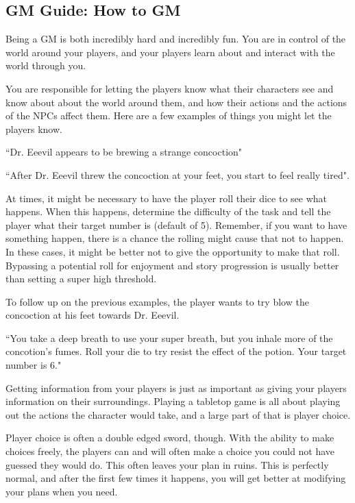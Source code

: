 \begin{flushleft}

\chapter{GM Guide: How to GM} \label{gmguide}

Being a GM is both incredibly hard and incredibly fun. You are in control of
the world around your players, and your players learn about and interact with
the world through you.

You are responsible for letting the players know what their characters see and
know about about the world around them, and how their actions and the actions
of the NPCs affect them. Here are a few examples of things you might let the
players know.

``Dr. Eeevil appears to be brewing a strange concoction"

``After Dr. Eeevil threw the concoction at your feet, you start to feel really
tired".

At times, it might be necessary to have the player roll their dice to see what
happens. When this happens, determine the difficulty of the task and tell the
player what their target number is (default of 5). Remember, if you want to
have something happen, there is a chance the rolling might cause that not
to happen. In these cases, it might be better not to give the opportunity to
make that roll. Bypassing a potential roll for enjoyment and story progression
is usually better than setting a super high threshold.

To follow up on the previous examples, the player wants to try blow the
concoction at his feet towards Dr. Eeevil.

``You take a deep breath to use your super breath, but you inhale more of the
concotion's fumes. Roll your die to try resist the effect of the potion. Your
target number is 6."

Getting information from your players is just as important as giving your
players information on their surroundings. Playing a tabletop game is all
about playing out the actions the character would take, and a large part of
that is player choice.

Player choice is often a double edged sword, though. With the ability to make
choices freely, the players can and will often make a choice you could not have
guessed they would do. This often leaves your plan in ruins. This is perfectly
normal, and after the first few times it happens, you will get better at
modifying your plans when you need.


\end{flushleft}
